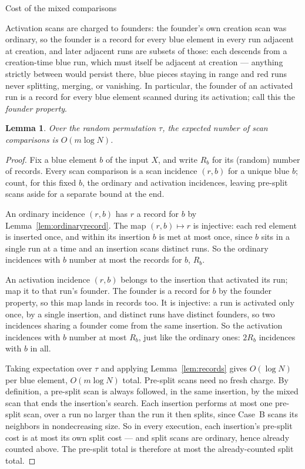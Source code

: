 \documentclass[11pt]{article}
\newtheorem{lem}[thm]{Lemma}
\theoremstyle{definition}
\numberwithin{equation}{section}
\begin{document}
\begin{section}{Cost of the mixed comparisons}
\begin{aiblock}
Activation scans are charged to founders: the founder's own
creation scan was ordinary, so the founder is a record for every
blue element in every run adjacent at creation, and later adjacent runs
are subsets of those: each descends from a creation-time blue run, which must itself be adjacent at creation --- anything strictly between would persist there, blue pieces staying in range and red runs never splitting, merging, or vanishing. In particular, the founder of an activated run is a
record for every blue element scanned during its activation; call
this the {\em founder property}.

\begin{lem}\label{lem:scancost}
Over the random permutation $\tau$, the expected number of scan
comparisons is $O(m \log N)$.
\end{lem}
\begin{proof}
Fix a blue element $b$ of the input $X$, and write $R_b$ for its
(random) number of records. Every scan comparison is a scan
incidence $(r,b)$ for a unique blue $b$; count, for this fixed $b$,
the ordinary and activation incidences, leaving pre-split scans
aside for a separate bound at the end.

An ordinary incidence $(r,b)$ has $r$ a record for $b$ by
Lemma~\ref{lem:ordinaryrecord}. The map $(r,b) \mapsto r$ is
injective: each red element is inserted once, and within its insertion $b$
is met at most once, since $b$ sits in a single run at a time and
an insertion scans distinct runs. So the ordinary incidences with
$b$ number at most the records for $b$, $R_b$.

An activation incidence $(r,b)$ belongs to the insertion that
activated its run; map it to that run's founder. The founder is a
record for $b$ by the founder property, so this map lands in
records too. It is injective: a run is activated only once, by a
single insertion, and distinct runs have distinct founders, so two
incidences sharing a founder come from the same insertion. So the
activation incidences with $b$ number at most $R_b$, just like the
ordinary ones: $2R_b$ incidences with $b$ in all.

Taking expectation over $\tau$ and applying
Lemma~\ref{lem:records} gives $O(\log N)$ per blue element, $O(m \log N)$
total. Pre-split scans need no fresh charge. By definition, a pre-split
scan is always followed, in the same insertion, by the mixed scan
that ends the insertion's search. Each insertion performs at most
one pre-split scan, over a run no larger than the run it then
splits, since Case~B scans its neighbors in nondecreasing size. So
in every execution, each insertion's pre-split cost is at most its
own split cost --- and split scans are ordinary, hence already
counted above. The pre-split total is therefore at most the
already-counted split total.
\end{proof}


\end{aiblock}
\end{section}
\end{document}
